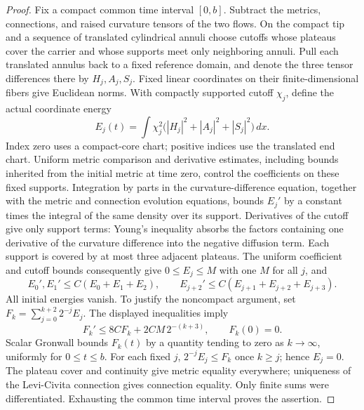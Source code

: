 \begin{proof}
Fix a compact common time interval $[0,b]$.  Subtract the metrics,
connections, and raised curvature tensors of the two flows.  On the
compact tip and a sequence of translated cylindrical annuli choose
cutoffs whose plateaus cover the carrier and whose supports meet only
neighboring annuli.  Pull each translated annulus back to a fixed
reference domain, and denote the three tensor differences there by
$H_j,A_j,S_j$.  Fixed linear coordinates on their finite-dimensional
fibers give Euclidean norms.  With compactly supported cutoff $\chi_j$,
define the actual coordinate energy
\[
 E_j(t)=\int \chi_j^2
       \bigl(|H_j|^2+|A_j|^2+|S_j|^2\bigr)\,dx.
\]
Index zero uses a compact-core chart; positive indices use the
translated end chart.  Uniform metric comparison and derivative
estimates, including bounds inherited from the initial metric at
time zero, control the coefficients on these fixed supports.
Integration by parts in the curvature-difference
equation, together with the metric and connection evolution equations,
bounds $E_j'$ by a constant times the integral of the
same density over its support.  Derivatives of the cutoff give only
support terms: Young's inequality absorbs the factors containing
one derivative of the curvature difference into the negative
diffusion term.  Each support is covered by at most three adjacent
plateaus.  The uniform coefficient and cutoff bounds consequently give
$0\leq E_j\leq M$ with one $M$ for all $j$, and
\[
 E_0',E_1'\leq C(E_0+E_1+E_2),\qquad
 E_{j+2}'\leq C(E_{j+1}+E_{j+2}+E_{j+3}).
\]
All initial energies vanish.  To justify the noncompact argument, set
$F_k=\sum_{j=0}^{k+2}2^{-j}E_j$.  The displayed inequalities imply
\[
 F_k'\leq8CF_k+2CM\,2^{-(k+3)},\qquad F_k(0)=0.
\]
Scalar Gronwall bounds $F_k(t)$ by a quantity tending to zero as
$k\to\infty$, uniformly for $0\leq t\leq b$.  For each fixed $j$,
$2^{-j}E_j\leq F_k$ once $k\geq j$; hence $E_j=0$.
The plateau cover and continuity give metric equality everywhere;
uniqueness of the Levi-Civita connection gives connection equality.
Only finite sums were differentiated.  Exhausting the common time
interval proves the assertion.
\end{proof}

